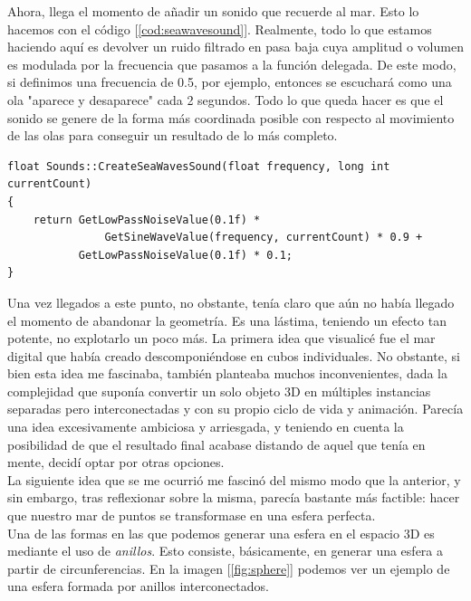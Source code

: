 Ahora, llega el momento de añadir un sonido que recuerde al mar. Esto lo hacemos con el código [\ref{cod:seawavesound}]. Realmente, todo lo que estamos haciendo aquí es devolver un ruido filtrado en pasa baja cuya amplitud o volumen es modulada por la frecuencia que pasamos a la función delegada. De este modo, si definimos una frecuencia de 0.5, por ejemplo, entonces se escuchará como una ola "aparece y desaparece" cada 2 segundos. Todo lo que queda hacer es que el sonido se genere de la forma más coordinada posible con respecto al movimiento de las olas para conseguir un resultado de lo más completo.\\

\begin{lstlisting}[style=C-color, caption={Generación de un sonido de olas},label=cod:seawavesound, escapechar=|]
float Sounds::CreateSeaWavesSound(float frequency, long int currentCount)
{
    return GetLowPassNoiseValue(0.1f) *
               GetSineWaveValue(frequency, currentCount) * 0.9 +
           GetLowPassNoiseValue(0.1f) * 0.1;
}
\end{lstlisting}

Una vez llegados a este punto, no obstante, tenía claro que aún no había llegado el momento de abandonar la geometría. Es una lástima, teniendo un efecto tan potente, no explotarlo un poco más. La primera idea que visualicé fue el mar digital que había creado descomponiéndose en cubos individuales. No obstante, si bien esta idea me fascinaba, también planteaba muchos inconvenientes, dada la complejidad que suponía convertir un solo objeto 3D en múltiples instancias separadas pero interconectadas y con su propio ciclo de vida y animación. Parecía una idea excesivamente ambiciosa y arriesgada, y teniendo en cuenta la posibilidad de que el resultado final acabase distando de aquel que tenía en mente, decidí optar por otras opciones.\\

La siguiente idea que se me ocurrió me fascinó del mismo modo que la anterior, y sin embargo, tras reflexionar sobre la misma, parecía bastante más factible: hacer que nuestro mar de puntos se transformase en una esfera perfecta.\\

Una de las formas en las que podemos generar una esfera en el espacio 3D es mediante el uso de \emph{anillos}. Esto consiste, básicamente, en generar una esfera a partir de circunferencias. En la imagen [\ref{fig:sphere}] podemos ver un ejemplo de una esfera formada por anillos interconectados.\\

